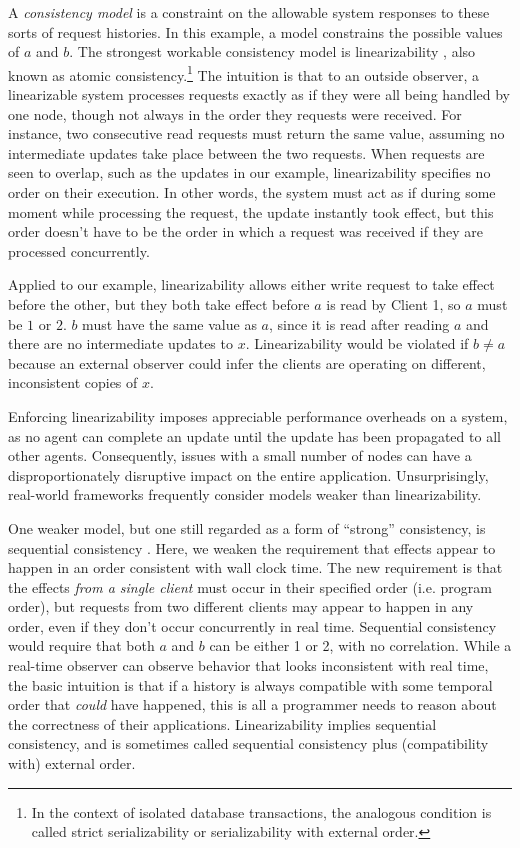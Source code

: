 A \emph{consistency model} is a constraint on the allowable system
responses to these sorts of request histories. In this example, a
model constrains the possible values of $a$ and $b$. The strongest
workable consistency model is linearizability
\cite{10.1145/78969.78972}, also known as atomic
consistency.\footnote{In the context of isolated database
transactions, the analogous condition is called strict serializability
or serializability with external order.} The intuition is that to an
outside observer, a linearizable system processes requests exactly as
if they were all being handled by one node, though not always in the
order they requests were received. For instance, two consecutive read
requests must return the same value, assuming no intermediate updates
take place between the two requests. When requests are seen to
overlap, such as the updates in our example, linearizability specifies
no order on their execution. In other words, the system must act as if
during some moment while processing the request, the update instantly
took effect, but this order doesn't have to be the order in which a
request was received if they are processed concurrently.

Applied to our example, linearizability allows either write request to
take effect before the other, but they both take effect before $a$ is
read by Client 1, so $a$ must be $1$ or $2$. $b$ must have the same
value as $a$, since it is read after reading $a$ and there are no
intermediate updates to $x$. Linearizability would be violated if $b
\neq a$ because an external observer could infer the clients are
operating on different, inconsistent copies of $x$.

Enforcing linearizability imposes appreciable performance overheads on
a system, as no agent can complete an update until the update has been
propagated to all other agents. Consequently, issues with a small
number of nodes can have a disproportionately disruptive impact on the
entire application. Unsurprisingly, real-world frameworks frequently
consider models weaker than linearizability.

One weaker model, but one still regarded as a form of ``strong''
consistency, is sequential consistency
\cite{1979LamportSequential}. Here, we weaken the requirement that
effects appear to happen in an order consistent with wall clock
time. The new requirement is that the effects \emph{from a single
client} must occur in their specified order (i.e. program order), but
requests from two different clients may appear to happen in any order,
even if they don't occur concurrently in real time. Sequential
consistency would require that both $a$ and $b$ can be either 1 or 2,
with no correlation. While a real-time observer can observe behavior
that looks inconsistent with real time, the basic intuition is that if
a history is always compatible with some temporal order that
\emph{could} have happened, this is all a programmer needs to reason
about the correctness of their applications. Linearizability implies
sequential consistency, and is sometimes called sequential consistency
plus (compatibility with) external order.

